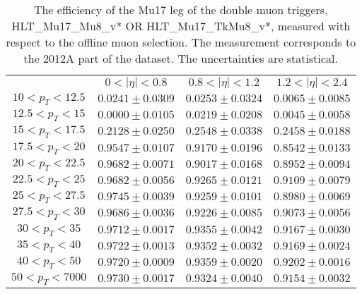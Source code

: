 \begin{table}[!ht]
\begin{center}
\begin{tabular}{c|c|c|c}
\hline & $0 < |\eta| < 0.8$ & $0.8 < |\eta| < 1.2$ & $1.2 < |\eta| < 2.4$  \\
$ 10 < p_T < 12.5$ & $0.0241 \pm 0.0309$ & $0.0253 \pm 0.0324$ & $0.0065 \pm 0.0085$  \\
$12.5 < p_T <  15$ & $0.0000 \pm 0.0105$ & $0.0219 \pm 0.0208$ & $0.0045 \pm 0.0058$  \\
$ 15 < p_T < 17.5$ & $0.2128 \pm 0.0250$ & $0.2548 \pm 0.0338$ & $0.2458 \pm 0.0188$  \\
$17.5 < p_T <  20$ & $0.9547 \pm 0.0107$ & $0.9170 \pm 0.0196$ & $0.8542 \pm 0.0133$  \\
$ 20 < p_T < 22.5$ & $0.9682 \pm 0.0071$ & $0.9017 \pm 0.0168$ & $0.8952 \pm 0.0094$  \\
$22.5 < p_T <  25$ & $0.9682 \pm 0.0056$ & $0.9265 \pm 0.0121$ & $0.9109 \pm 0.0079$  \\
$ 25 < p_T < 27.5$ & $0.9745 \pm 0.0039$ & $0.9259 \pm 0.0101$ & $0.8980 \pm 0.0069$  \\
$27.5 < p_T <  30$ & $0.9686 \pm 0.0036$ & $0.9226 \pm 0.0085$ & $0.9073 \pm 0.0056$  \\
$ 30 < p_T <  35$ & $0.9712 \pm 0.0017$ & $0.9355 \pm 0.0042$ & $0.9167 \pm 0.0030$  \\
$ 35 < p_T <  40$ & $0.9722 \pm 0.0013$ & $0.9352 \pm 0.0032$ & $0.9169 \pm 0.0024$  \\
$ 40 < p_T <  50$ & $0.9720 \pm 0.0009$ & $0.9359 \pm 0.0020$ & $0.9202 \pm 0.0016$  \\
$ 50 < p_T < 7000$ & $0.9730 \pm 0.0017$ & $0.9324 \pm 0.0040$ & $0.9154 \pm 0.0032$  \\
\hline
\hline
\end{tabular}
\caption{The efficiency of the Mu17 leg of the double muon triggers,
HLT\_Mu17\_Mu8\_v* OR HLT\_Mu17\_TkMu8\_v*,
measured with respect to the offline muon selection. 
The measurement corresponds to the 2012A part of the dataset.
The uncertainties are statistical.}
\label{tab:eff_muon_lead_dbl}
\end{center}
\end{table}


